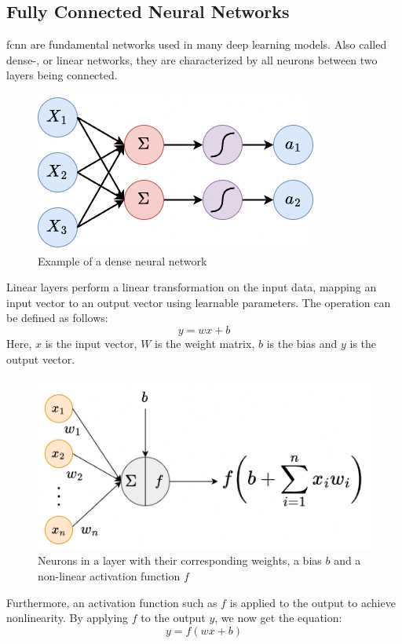 \subsection{Fully Connected Neural Networks}
\label{back:linear}

\acrfull{fcnn} are fundamental networks used in many deep learning models. Also called dense-, or linear networks, they are characterized by all neurons between two layers being connected. 
\begin{figure}[!h]
    \centering
    \includegraphics[width=0.5\linewidth]{figures/linearlayer.png}
    \caption{Example of a dense neural network}
    \label{fig:densenn}
\end{figure}


Linear layers perform a linear transformation on the input data, mapping an input vector to an output vector using learnable parameters. The operation can be defined as follows:
\begin{equation}\label{f:wxb}
    y = wx+b
\end{equation}
Here, $x$ is the input vector, $W$ is the weight matrix, $b$ is the bias and $y$ is the output vector.

\begin{figure}[!h]
    \centering
    \includegraphics[width=0.7\linewidth]{figures/dl.png}
    \caption{Neurons in a layer with their corresponding weights, a bias $b$ and a non-linear activation function $f$}
    \label{fig:dl}
\end{figure}

Furthermore, an activation function such as $f$ is applied to the output to achieve nonlinearity. By applying $f$ to the output $y$, we now get the equation:
\begin{equation}\label{f:fwxb}
    y = f(wx+b)
\end{equation}

